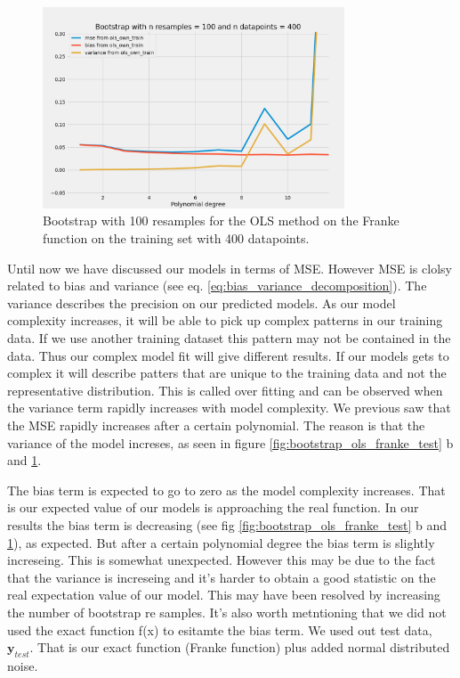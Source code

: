 \begin{figure}[H]
    \centering
    \includegraphics[width=0.8\textwidth]{Figures/c_bootstrap_ols_n_data_400_train_data.png}
    \caption{Bootstrap with 100 resamples for the OLS method on the Franke
    function on the training set with 400 datapoints.}
    \label{fig:bootstrap_ols_franke_train}
\end{figure}

Until now we have discussed our models in terms of MSE. However MSE is clolsy
related to bias and variance (see eq. \eqref{eq:bias_variance_decomposition}).
The variance describes the precision on our predicted models. As our model
complexity increases, it will be able to pick up complex patterns in our
training data. If we use another training dataset this pattern may not be
contained in the data. Thus our complex model fit will give different results.
If our models gets to complex it will describe patters that are unique to the
training data and not the representative distribution. This is called
over fitting and can be observed when the variance term rapidly increases with
model complexity. We previous saw that the MSE rapidly increases after a
certain polynomial. The reason is that the variance of the model increses, as
seen in figure \ref{fig:bootstrap_ols_franke_test} b and
\ref{fig:bootstrap_ols_franke_train}. 

The bias term is expected to go to zero as the model complexity increases. That
is our expected value of our models is approaching the real function. In our
results the bias term is decreasing (see fig \ref{fig:bootstrap_ols_franke_test} b and
\ref{fig:bootstrap_ols_franke_train}), as expected. But after a certain
polynomial degree the bias term is slightly increseing. This is somewhat
unexpected. However this may be due to the fact that the variance is
increseing and it's harder to obtain a good statistic on the real expectation
value of our model. This may have been resolved by increasing the number of
bootstrap re samples. It's also worth metntioning that we did not used the
exact function f(x) to esitamte the bias term. We used out test data, $\bm{y}
_{test} $. That is our exact function (Franke function) plus added normal
distributed noise. 





